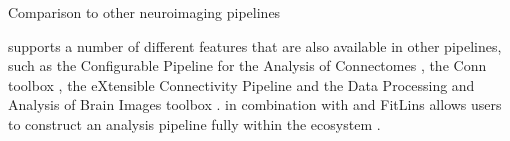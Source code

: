 \begin{tablebox}[label={table:comparison}]{Comparison to other neuroimaging pipelines}

 supports a number of different features that are also available in other pipelines, such as the Configurable Pipeline for the Analysis of Connectomes  \parencite{craddock2013}, the Conn toolbox \parencite{whitfieldgabrieli2012}, the eXtensible Connectivity Pipeline  \parencite{ciric2018} and the Data Processing and Analysis of Brain Images toolbox  \parencite{yan2016}.  \parencite{esteban2019a} in combination with  \parencite{esteban2017} and FitLins \parencite{markiewicz2021} allows users to construct an analysis pipeline fully within the  ecosystem \parencite{esteban2020c}.
\\


\end{tablebox}
